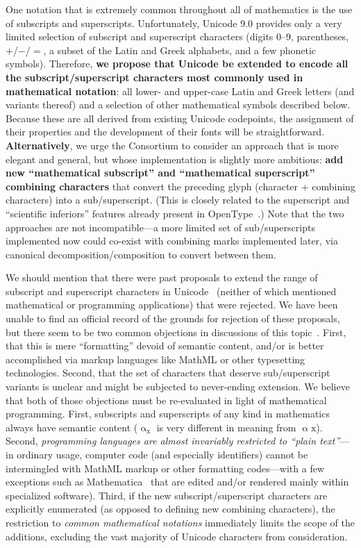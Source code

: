 \documentclass[10pt,english]{article}
\begin{document}
One notation that is extremely common throughout all of mathematics
is the use of subscripts and superscripts. Unfortunately, Unicode
9.0 provides only a very limited selection of subscript and superscript
characters (digits 0--9, parentheses, $+$/$-$/$=$, a subset of
the Latin and Greek alphabets, and a few phonetic symbols). Therefore,\textbf{
we propose that Unicode be extended to encode all the subscript/superscript
characters most commonly used in mathematical notation}: all lower-
and upper-case Latin and Greek letters (and variants thereof) and
a selection of other mathematical symbols described below. Because
these are all derived from existing Unicode codepoints, the assignment
of their properties and the development of their fonts will be straightforward.
\textbf{Alternatively}, we urge the Consortium to consider an approach
that is more elegant and general, but whose implementation is slightly
more ambitious: \textbf{add new ``mathematical subscript'' and ``mathematical
superscript'' combining characters} that convert the preceding glyph
(character + combining characters) into a sub/superscript. (This is
closely related to the superscript and ``scientific
inferiors'' features already present in OpenType~\cite{OpenType}.)
Note that the two approaches are not incompatible---a more limited
set of sub/superscripts implemented now could co-exist with combining
marks implemented later, via canonical decomposition/composition to
convert between them.

We should mention that there were past proposals to extend the range
of subscript and superscript characters in Unicode~\cite{L2-10-230,L2-11-208}
(neither of which mentioned mathematical or programming applications)
that were rejected. We have been unable to find an official record
of the grounds for rejection of these proposals, but there seem to
be two common objections in discussions of this topic~\cite{Miller10,UCDF}.
First, that this is mere ``formatting''
devoid of semantic content, and/or is better accomplished via markup
languages like MathML or other typesetting technologies. Second, that
the set of characters that deserve sub/superscript variants is unclear
and might be subjected to never-ending extension. We believe that
both of those objections must be re-evaluated in light of mathematical
programming. First, subscripts and superscripts of any kind in mathematics
always have semantic content ($\mathrm{{\upalpha_{x}}}$ is very different
in meaning from $\mathrm{\upalpha\mathrm{{x}}}$). Second, \emph{programming
languages are almost invariably restricted to ``plain text''}---in
ordinary usage, computer code (and especially identifiers) cannot
be intermingled with MathML markup or other formatting codes---with
a few exceptions such as Mathematica~\cite{Mathematica} that are
edited and/or rendered mainly within specialized software). Third,
if the new subscript/superscript characters are explicitly enumerated (as
opposed to defining new combining characters), the restriction to
\emph{common mathematical notations} immediately limits the scope
of the additions, excluding the vast majority of Unicode characters
from consideration.
\end{document}
